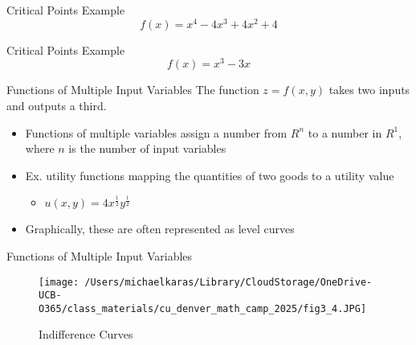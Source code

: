 \documentclass[aspectratio=169]{beamer}
\begin{document}
\begin{frame}{Critical Points Example}\label{main1}
	\vspace{-4cm}
     \[
    f(x) = x^4 - 4x^3 + 4x^2 + 4
    \]
\end{frame}

\begin{frame}{Critical Points Example}\label{main2}
    \vspace{-4cm}
    \[
    f(x) = x^3 - 3x
    \]
\end{frame}

\begin{frame}{Functions of Multiple Input Variables}\label{main1}
    The function $z = f(x, y)$ takes two inputs and outputs a third.
    \begin{itemize}
        \item Functions of multiple variables assign a number from $R^n$ to a number in $R^1$, where $n$ is the number of input variables
        \item Ex. utility functions mapping the quantities of two goods to a utility value
        \begin{itemize}
        \item $u(x,y) = 4x^{\frac{1}{2}}y^{\frac{1}{2}}$
    	\end{itemize}
    	\item Graphically, these are often represented as level curves
    \end{itemize}
\end{frame}

\begin{frame}{Functions of Multiple Input Variables}\label{main1}
  \begin{figure}
    \caption{Indifference Curves}
    \texttt{[image: /Users/michaelkaras/Library/CloudStorage/OneDrive-UCB-O365/class\_materials/cu\_denver\_math\_camp\_2025/fig3\_4.JPG]}
  \end{figure}
\end{frame}
\end{document}
